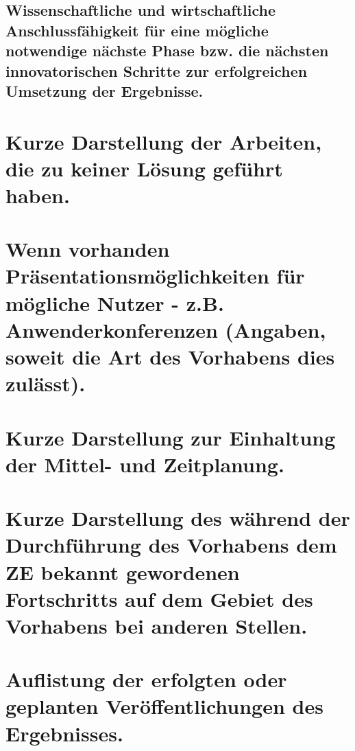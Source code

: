 \subsection{Wissenschaftliche und wirtschaftliche Anschlussfähigkeit für eine mögliche notwendige nächste Phase bzw. die nächsten innovatorischen Schritte zur erfolgreichen Umsetzung der Ergebnisse.}

\section{Kurze Darstellung der Arbeiten, die zu keiner Lösung geführt haben.}

\section{Wenn vorhanden Präsentationsmöglichkeiten für mögliche Nutzer - z.B. Anwenderkonferenzen (Angaben, soweit die Art des Vorhabens dies zulässt).}

\section{Kurze Darstellung zur Einhaltung der Mittel- und Zeitplanung.}

\section{Kurze Darstellung des während der Durchführung des Vorhabens dem ZE bekannt gewordenen Fortschritts auf dem Gebiet des Vorhabens bei anderen Stellen.}

\section{Auflistung der erfolgten oder geplanten Veröffentlichungen des Ergebnisses.}

